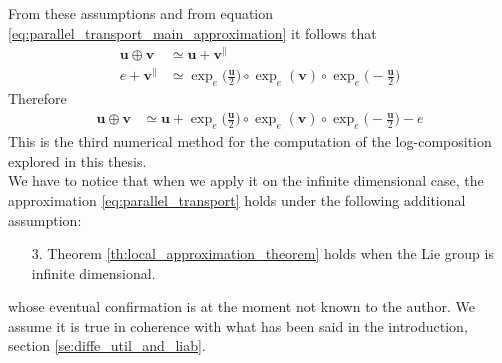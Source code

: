 From these assumptions and from equation \ref{eq:parallel_transport_main_approximation} it follows that 
\begin{align*}
\mathbf{u}\oplus \mathbf{v}
&\simeq
\mathbf{u} + \mathbf{v}^{\parallel}
\\
e + \mathbf{v}^{\parallel}
&\simeq
\exp_{e}\big(\frac{\mathbf{u}}{2}\big)   
\circ  \exp_{e}(\mathbf{v}) 
\circ \exp_{e}\big(-\frac{\mathbf{u}}{2}\big)
\end{align*}
Therefore
\begin{align}\label{eq:parallel_transport}
\mathbf{u}\oplus \mathbf{v}
&\simeq
\mathbf{u} 
+
\exp_{e}\big(\frac{\mathbf{u}}{2}\big)   
\circ  \exp_{e}(\mathbf{v}) 
\circ \exp_{e}\big(-\frac{\mathbf{u}}{2}\big)
 -
 e
\end{align}
This is the third numerical method for the computation of the log-composition explored in this thesis.\\
We have to notice that when we apply it on the infinite dimensional case, the approximation \ref{eq:parallel_transport} holds under the following additional assumption:
\begin{enumerate}
\item[3.] Theorem \ref{th:local_approximation_theorem} holds when the Lie group is infinite dimensional.
\end{enumerate}
whose eventual confirmation is at the moment not known to the author. We assume it is true in coherence with what has been said in the introduction, section \ref{se:diffe_util_and_liab}.










